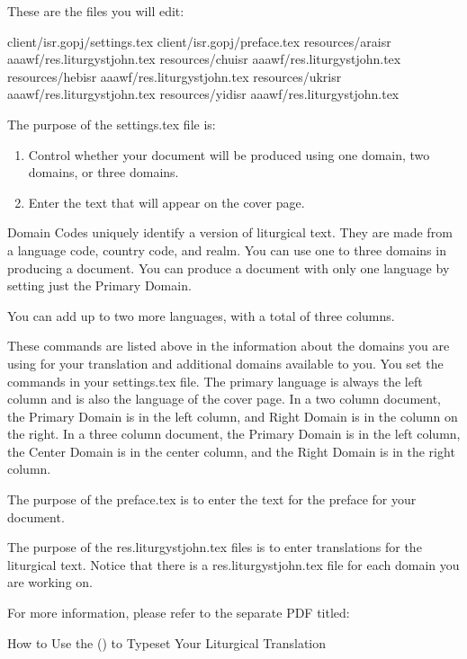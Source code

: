 \documentclass[]{memoir}
\begin{document}
These are the files you will edit:

\pex

\a client/isr.gopj/settings.tex
\a client/isr.gopj/preface.tex
\a resources/ara\textunderscore isr \textunderscore aaawf/res.liturgystjohn.tex
\a resources/chu\textunderscore isr \textunderscore aaawf/res.liturgystjohn.tex
\a resources/heb\textunderscore isr \textunderscore aaawf/res.liturgystjohn.tex
\a resources/ukr\textunderscore isr \textunderscore aaawf/res.liturgystjohn.tex
\a resources/yid\textunderscore isr \textunderscore aaawf/res.liturgystjohn.tex
\xe

The purpose of the settings.tex file is:
\begin{enumerate}
\item Control whether your document will be produced using one domain, two domains, or three domains.
\item Enter the text that will appear on the cover page.
\end{enumerate}

Domain Codes uniquely identify a version of liturgical text. They are made from a language code, country code, and realm. You can use one to three domains in producing a document. You can produce a document with only one language by setting just the Primary Domain. 

You can add up to two more languages, with a total of three columns. 

These commands are listed above in the information about the domains you are using for your translation and additional domains available to you. You set the commands in your settings.tex file. The primary language is always the left column and is also the language of the cover page.  In a two column document, the Primary Domain is in the left column, and Right Domain is in the column on the right.  In a three column document, the Primary Domain is in the left column, the Center Domain is in the center column, and the Right Domain is in the right column.

The purpose of the preface.tex is to enter the text for the preface for your document.

The purpose of the res.liturgystjohn.tex files is to enter translations for the liturgical text.  Notice that there is a res.liturgystjohn.tex file for each domain you are working on.

\bigskip
For more information, please refer to the separate PDF titled:
\bigskip

\noindent How to Use the \ltOcmcSystem (\ltOcmcSystemAcronymn) to Typeset Your Liturgical Translation

 
\end{document}
